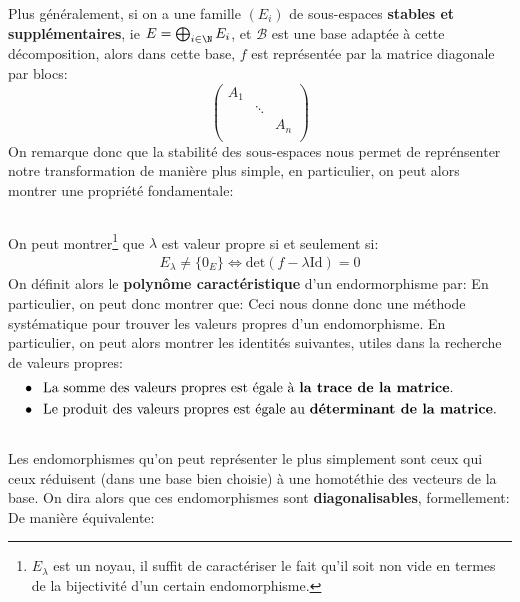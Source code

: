 Plus généralement, si on a une famille \((E_i)\) de sous-espaces \textbf{stables et supplémentaires}, ie \(E = \bigoplus_{i \in \N} E_i\), et \(\mathcal{B}\) est une base adaptée à cette décomposition, alors dans cette base, \(f\) est représentée par la matrice diagonale par blocs:
\[
   \left(\begin{array}{ccc}
      A_1 & {} & {}\\
      {} & \ddots & {}\\
      {} & {} & A_n\\
   \end{array}\right)
\]
On remarque donc que la stabilité des sous-espaces nous permet de reprénsenter notre transformation de manière plus simple, en particulier, on peut alors montrer une propriété fondamentale:

\subsection*{}
On peut montrer\footnote[1]{\(E_\lambda\) est un noyau, il suffit de caractériser le fait qu'il soit non vide en termes de la bijectivité d'un certain endomorphisme.} que \(\lambda\) est valeur propre si et seulement si:
\begin{align*}
   E_\lambda \neq \bigl\{0_E\bigl\} \Longleftrightarrow \text{det}(f - \lambda \text{Id}) = 0
\end{align*}
On définit alors le \textbf{polynôme caractéristique} d'un endormorphisme par:
En particulier, on peut donc montrer que:
Ceci nous donne donc une méthode systématique pour trouver les valeurs propres d'un endomorphisme. En particulier, on peut alors montrer les identités suivantes, utiles dans la recherche de valeurs propres:
\begin{align*}
   &\bullet \;\; \text{La somme des valeurs propres est égale à \textbf{la trace de la matrice}.} \\
   &\bullet \;\; \text{Le produit des valeurs propres est égale au \textbf{déterminant de la matrice}.}
\end{align*}

\subsection*{}
Les endomorphismes qu'on peut représenter le plus simplement sont ceux qui ceux réduisent (dans une base bien choisie) à une homotéthie des vecteurs de la base. On dira alors que ces endomorphismes sont \textbf{diagonalisables}, formellement:
De manière équivalente:

